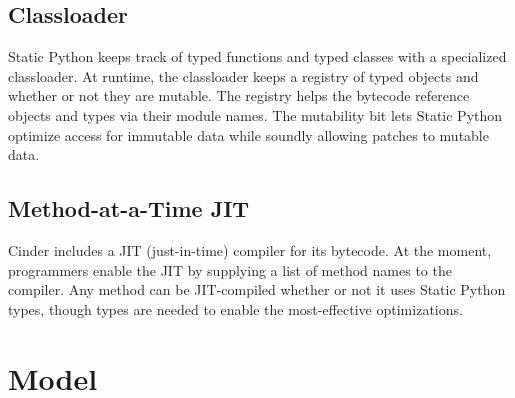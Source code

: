 \documentclass[english,cleveref,submission]{programming}
\newcommand{\SP}{Static Python}
\begin{document}
\subsection{Classloader}
\label{s:classloader}

\SP{} keeps track of typed functions and typed classes with a specialized classloader.
At runtime, the classloader keeps a registry of typed objects and whether or not they
are mutable.
The registry helps the bytecode reference objects and types via their module names.
The mutability bit lets \SP{} optimize access for immutable data while soundly allowing
patches to mutable data.


\subsection{Method-at-a-Time JIT}
\label{s:jit}

Cinder includes a JIT (just-in-time) compiler for its bytecode.
At the moment, programmers enable the JIT by supplying a list of method names
to the compiler.
Any method can be JIT-compiled whether or not it uses \SP{} types,
though types are needed to enable the most-effective optimizations.



\section{Model}
\label{s:model}

\end{document}
